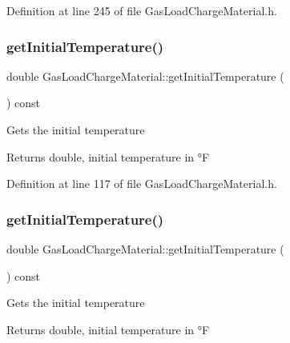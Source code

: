 Definition at line 245 of file Gas\+Load\+Charge\+Material.\+h.

\mbox{\label{class_gas_load_charge_material_af8a83c3720d108baa196394105822db7}} 
\subsubsection{\texorpdfstring{get\+Initial\+Temperature()}{getInitialTemperature()}\hspace{0.1cm}{\footnotesize\ttfamily [1/3]}}
{\footnotesize\ttfamily double Gas\+Load\+Charge\+Material\+::get\+Initial\+Temperature (\begin{DoxyParamCaption}{ }\end{DoxyParamCaption}) const\hspace{0.3cm}{\ttfamily [inline]}}

Gets the initial temperature \begin{DoxyReturn}{Returns}
double, initial temperature in °F 
\end{DoxyReturn}


Definition at line 117 of file Gas\+Load\+Charge\+Material.\+h.

\mbox{\label{class_gas_load_charge_material_af8a83c3720d108baa196394105822db7}} 
\subsubsection{\texorpdfstring{get\+Initial\+Temperature()}{getInitialTemperature()}\hspace{0.1cm}{\footnotesize\ttfamily [2/3]}}
{\footnotesize\ttfamily double Gas\+Load\+Charge\+Material\+::get\+Initial\+Temperature (\begin{DoxyParamCaption}{ }\end{DoxyParamCaption}) const\hspace{0.3cm}{\ttfamily [inline]}}

Gets the initial temperature \begin{DoxyReturn}{Returns}
double, initial temperature in °F 
\end{DoxyReturn}


